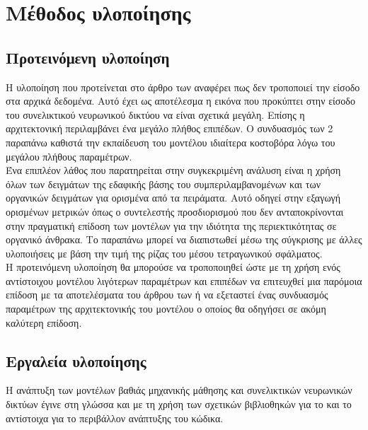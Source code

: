 \chapter{Μέθοδος υλοποίησης}
\label{ch:implementation_method}

\section{Προτεινόμενη υλοποίηση}
Η υλοποίηση που προτείνεται στο άρθρο των \cite{padarian_lucas_soil} αναφέρει πως δεν τροποποιεί την είσοδο στα αρχικά δεδομένα. Αυτό έχει ως αποτέλεσμα η εικόνα που προκύπτει στην είσοδο του συνελικτικού νευρωνικού δικτύου να είναι σχετικά μεγάλη. Επίσης η αρχιτεκτονική περιλαμβάνει ένα μεγάλο πλήθος επιπέδων. Ο συνδυασμός των 2 παραπάνω καθιστά την εκπαίδευση του μοντέλου ιδιαίτερα κοστοβόρα λόγω του μεγάλου πλήθους παραμέτρων.\\

Ένα επιπλέον λάθος που παρατηρείται στην συγκεκριμένη ανάλυση είναι η χρήση όλων των δειγμάτων της εδαφικής βάσης του  συμπεριλαμβανομένων και των οργανικών δειγμάτων για ορισμένα από τα πειράματα. Αυτό οδηγεί στην εξαγωγή ορισμένων μετρικών όπως ο συντελεστής προσδιορισμού που δεν ανταποκρίνονται στην πραγματική επίδοση των μοντέλων για την ιδιότητα της περιεκτικότητας σε οργανικό άνθρακα. Το παραπάνω μπορεί να διαπιστωθεί μέσω της σύγκρισης με άλλες υλοποιήσεις με βάση την τιμή της ρίζας του μέσου τετραγωνικού σφάλματος.\\

Η προτεινόμενη υλοποίηση θα μπορούσε να τροποποιηθεί ώστε με τη χρήση ενός αντίστοιχου μοντέλου λιγότερων παραμέτρων και επιπέδων να επιτευχθεί μια παρόμοια επίδοση με τα αποτελέσματα του άρθρου των  ή να εξεταστεί ένας συνδυασμός παραμέτρων της αρχιτεκτονικής του μοντέλου ο οποίος θα οδηγήσει σε ακόμη καλύτερη επίδοση.

\section{Εργαλεία υλοποίησης}
Η ανάπτυξη των μοντέλων βαθιάς μηχανικής μάθησης και συνελικτικών νευρωνικών δικτύων έγινε στη γλώσσα  και με τη χρήση των σχετικών βιβλιοθηκών  για το  και το  αντίστοιχα για το περιβάλλον ανάπτυξης του κώδικα.

